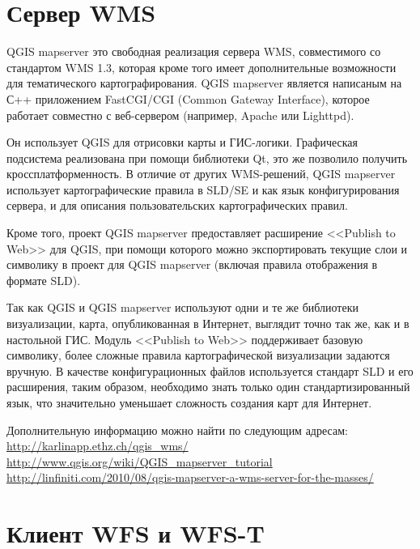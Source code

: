 %
%

\section{Сервер WMS}\label{sec:ogc-wmsserver}

QGIS mapserver это свободная реализация сервера WMS, совместимого со стандартом
WMS 1.3, которая кроме того имеет дополнительные возможности для тематического
картографирования. QGIS mapserver является написаным на С++ приложением FastCGI/CGI
(Common Gateway Interface), которое работает совместно с веб-сервером
(например, Apache или Lighttpd).

Он использует QGIS для отрисовки карты и ГИС-логики. Графическая подсистема
реализована при помощи библиотеки Qt, это же  позволило получить кроссплатформенность.
В отличие от других WMS-решений, QGIS mapserver использует картографические
правила в SLD/SE и как язык конфигурирования сервера, и для описания пользовательских
картографических правил.

Кроме того, проект QGIS mapserver предоставляет расширение <<Publish to Web>>
для QGIS, при помощи которого можно экспортировать текущие слои и символику
в проект для QGIS mapserver (включая правила отображения в формате SLD).

Так как QGIS и QGIS mapserver используют одни и те же библиотеки визуализации,
карта, опубликованная в Интернет, выглядит точно так же, как и в настольной
ГИС. Модуль <<Publish to Web>> поддерживает базовую символику, более сложные
правила картографической визуализации задаются вручную. В качестве конфигурационных
файлов используется стандарт SLD и его расширения, таким образом, необходимо
знать только один стандартизированный язык, что значительно уменьшает сложность
создания карт для Интернет.

Дополнительную информацию можно найти по следующим адресам: \\
\url{http://karlinapp.ethz.ch/qgis\_wms/} \\
\url{http://www.qgis.org/wiki/QGIS\_mapserver\_tutorial} \\
\url{http://linfiniti.com/2010/08/qgis-mapserver-a-wms-server-for-the-masses/}



%
%
\section{Клиент WFS и WFS-T}\label{sec:ogc-wfs}

